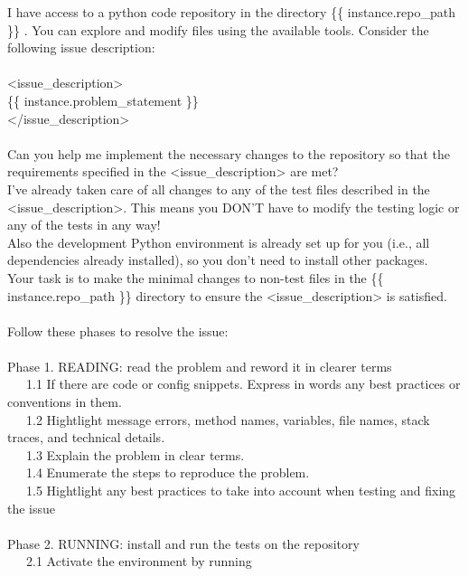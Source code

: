 \begin{tcolorbox}[colback=gray!5!white,colframe=gray!75!black,title=Issue-Solving Prompt,fontupper={\scriptsize\ttfamily\rightskip=0pt plus 1fil},breakable]
I have access to a python code repository in the directory \{\{ instance.repo\_path \}\} . You can explore and modify files using the available tools. Consider the following issue description:\\
\\
<issue\_description>\\
\{\{ instance.problem\_statement \}\}\\
</issue\_description>\\
\\
Can you help me implement the necessary changes to the repository so that the requirements specified in the <issue\_description> are met?\\
I've already taken care of all changes to any of the test files described in the <issue\_description>. This means you DON'T have to modify the testing logic or any of the tests in any way!\\
Also the development Python environment is already set up for you (i.e., all dependencies already installed), so you don't need to install other packages.\\
Your task is to make the minimal changes to non-test files in the \{\{ instance.repo\_path \}\} directory to ensure the <issue\_description> is satisfied.\\
\\
Follow these phases to resolve the issue:\\
\\
Phase 1. READING: read the problem and reword it in clearer terms\\
~~~1.1 If there are code or config snippets. Express in words any best practices or conventions in them.\\
~~~1.2 Hightlight message errors, method names, variables, file names, stack traces, and technical details.\\
~~~1.3 Explain the problem in clear terms.\\
~~~1.4 Enumerate the steps to reproduce the problem.\\
~~~1.5 Hightlight any best practices to take into account when testing and fixing the issue\\
\\
Phase 2. RUNNING: install and run the tests on the repository\\
~~~2.1 Activate the environment by running\\

\end{tcolorbox}
